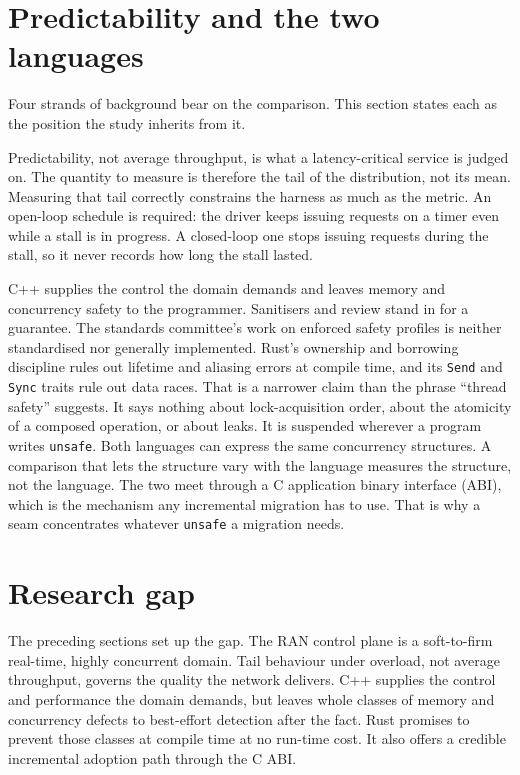 \documentclass[english,oneside,a4paper,censored,csm,software-track-2020]{HYthesisML}
\begin{document}
\section{Predictability and the two languages}\label{sec:bgbrief}
Four strands of background bear on the comparison. This section states each as the position
the study inherits from it.

Predictability, not average throughput, is what a latency-critical service is judged on. The
quantity to measure is therefore the tail of the distribution, not its mean. Measuring that
tail correctly constrains the harness as much as the metric. An open-loop schedule is
required: the driver keeps issuing requests on a timer even while a stall is in progress. A
closed-loop one stops issuing requests during the stall, so it never records how long the
stall lasted.

C++ supplies the control the domain demands and leaves memory and concurrency safety to the
programmer. Sanitisers and review stand in for a guarantee. The standards committee's work
on enforced safety profiles is neither standardised nor generally implemented. Rust's
ownership and borrowing discipline rules out lifetime and aliasing errors at compile time,
and its \texttt{Send} and \texttt{Sync} traits rule out data races. That is a narrower claim
than the phrase ``thread safety'' suggests. It says nothing about lock-acquisition order,
about the atomicity of a composed operation, or about leaks. It is suspended wherever a
program writes \texttt{unsafe}. Both languages can express the same concurrency structures. A
comparison that lets the structure vary with the language measures the structure, not the
language. The two meet through a C application binary interface (ABI), which is the mechanism
any incremental migration has to use. That is why a seam concentrates whatever \texttt{unsafe}
a migration needs.

\section{Research gap}\label{sec:gap}
The preceding sections set up the gap. The RAN control plane is a soft-to-firm real-time,
highly concurrent domain. Tail behaviour under overload, not average throughput, governs the
quality the network delivers. C++ supplies the control and performance the domain demands, but
leaves whole classes of memory and concurrency defects to best-effort detection after the
fact. Rust promises to prevent those classes at compile time at no run-time cost. It also
offers a credible incremental adoption path through the C ABI.
\end{document}
